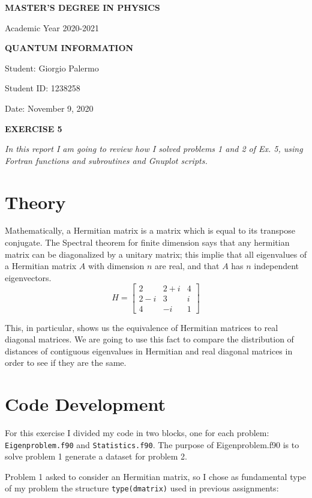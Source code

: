 \documentclass[a4paper]{article}
\newcommand{\thedate}{November 9, 2020}
\begin{document}
\hypersetup{linkcolor = black}
\hypersetup{linkcolor = blue}
\thispagestyle{plain}
\begin{center}
    \textbf{MASTER'S DEGREE IN PHYSICS}
    
    Academic Year 2020-2021
    
    \medskip
    \textbf{QUANTUM INFORMATION}
\end{center}

\vspace{0.0cm}
Student: Giorgio Palermo

Student ID: 1238258

Date: \thedate
\begin{center}
\textbf{EXERCISE 5}
\medskip
\end{center}
\noindent
\textit{In this report I am going to review how I solved problems 1 and 2 of Ex. 5, using Fortran functions and subroutines and Gnuplot scripts.}
\section*{Theory}
Mathematically, a Hermitian matrix is a matrix which is equal to its transpose conjugate.
The Spectral theorem for finite dimension says that any hermitian matrix can be diagonalized by a unitary matrix; this implie that all eigenvalues of a Hermitian matrix $A$ with dimension $n$ are real, and that $A$ has $n$ independent eigenvectors.
\[
H=\left[\begin{array}{ccc}
2 & 2+i & 4 \\
2-i & 3 & i \\
4 & -i & 1
\end{array}\right]
\]

This, in particular, shows us the equivalence of Hermitian matrices to real diagonal matrices.
We are going to use this fact to compare the distribution of distances of contiguous eigenvalues in Hermitian and real diagonal matrices in order to see if they are the same.


\section*{Code Development}
For this exercise I divided my code in two blocks, one for each problem: \lstinline{Eigenproblem.f90} and \lstinline{Statistics.f90}.
The purpose of Eigenproblem.f90 is to solve problem 1 generate a dataset for problem 2.

Problem 1 asked to consider an Hermitian matrix, so I chose as fundamental type of my problem the structure \lstinline{type(dmatrix)} used in previous assignments:
\end{document}
